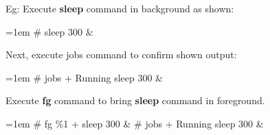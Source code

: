 \begin{flushleft}
\begin{enumerate}
\begin{itemize}
\begin{enumerate}
			Eg: Execute \textbf{sleep} command in background as shown:
			\begin{tcolorbox}[breakable,notitle,boxrule=-0pt,colback=black,colframe=black]
				\color{green}
				\font=1em
				\# sleep 300 \&
				\font=4pt
			\end{tcolorbox}
			Next, execute jobs command to confirm shown output:
			\begin{tcolorbox}[breakable,notitle,boxrule=-0pt,colback=black,colframe=black]
				\color{green}
				\font=1em
				\# jobs 
				\color{white}
				\newline
				[1]+  Running                 sleep 300 \&
				\font=4pt
			\end{tcolorbox}
			Execute \textbf{fg} command to bring \textbf{sleep} command in foreground.
			\begin{tcolorbox}[breakable,notitle,boxrule=-0pt,colback=black,colframe=black]
				\color{green}
				\font=1em
				\# fg \%1
				\color{white}
				\newline
				[1]+ sleep 300 \&
				\newline
				\color{green}
				\# jobs
				\color{white}
				\newline
				[1]+  Running                 sleep 300 \&
				\font=4pt
			\end{tcolorbox}
			
		\end{enumerate}
		


\end{itemize}
\end{enumerate}
\end{flushleft}
